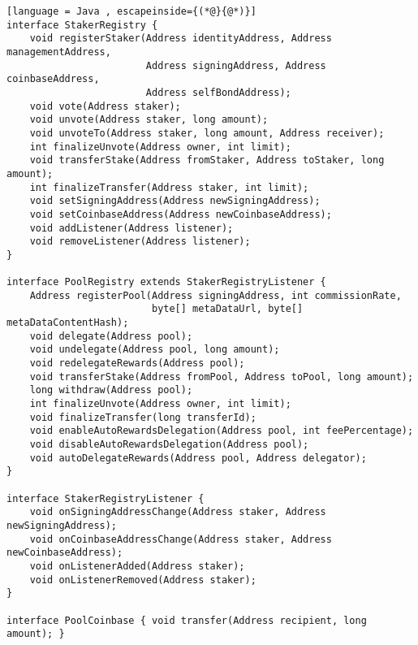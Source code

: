\begin{lstlisting}[language = Java , escapeinside={(*@}{@*)}]
interface StakerRegistry {
    void registerStaker(Address identityAddress, Address managementAddress,
                        Address signingAddress, Address coinbaseAddress, 
                        Address selfBondAddress);
    void vote(Address staker);
    void unvote(Address staker, long amount);
    void unvoteTo(Address staker, long amount, Address receiver);
    int finalizeUnvote(Address owner, int limit);
    void transferStake(Address fromStaker, Address toStaker, long amount);
    int finalizeTransfer(Address staker, int limit);
    void setSigningAddress(Address newSigningAddress);
    void setCoinbaseAddress(Address newCoinbaseAddress);
    void addListener(Address listener);
    void removeListener(Address listener);
}

interface PoolRegistry extends StakerRegistryListener {
    Address registerPool(Address signingAddress, int commissionRate, 
                         byte[] metaDataUrl, byte[] metaDataContentHash);
    void delegate(Address pool);
    void undelegate(Address pool, long amount);
    void redelegateRewards(Address pool);
    void transferStake(Address fromPool, Address toPool, long amount);
    long withdraw(Address pool);
    int finalizeUnvote(Address owner, int limit);
    void finalizeTransfer(long transferId);
    void enableAutoRewardsDelegation(Address pool, int feePercentage);
    void disableAutoRewardsDelegation(Address pool);
    void autoDelegateRewards(Address pool, Address delegator);
}

interface StakerRegistryListener {
    void onSigningAddressChange(Address staker, Address newSigningAddress);
    void onCoinbaseAddressChange(Address staker, Address newCoinbaseAddress);
    void onListenerAdded(Address staker);
    void onListenerRemoved(Address staker);
}

interface PoolCoinbase { void transfer(Address recipient, long amount); }

\end{lstlisting}